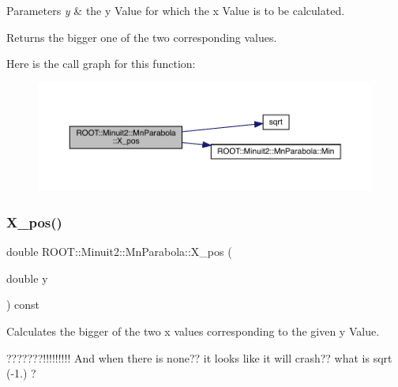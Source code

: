 \begin{DoxyParams}{Parameters}
{\em y} & the y Value for which the x Value is to be calculated.\\
\hline
\end{DoxyParams}
\begin{DoxyReturn}{Returns}
the bigger one of the two corresponding values. 
\end{DoxyReturn}
Here is the call graph for this function\+:
\nopagebreak
\begin{figure}[H]
\begin{center}
\leavevmode
\includegraphics[width=350pt]{db/d7d/classROOT_1_1Minuit2_1_1MnParabola_a2b4623df00488ca3d4175eb92123066e_cgraph}
\end{center}
\end{figure}
\mbox{\label{classROOT_1_1Minuit2_1_1MnParabola_a2b4623df00488ca3d4175eb92123066e}} 
\subsubsection{\texorpdfstring{X\_pos()}{X\_pos()}\hspace{0.1cm}{\footnotesize\ttfamily [2/2]}}
{\footnotesize\ttfamily double R\+O\+O\+T\+::\+Minuit2\+::\+Mn\+Parabola\+::\+X\+\_\+pos (\begin{DoxyParamCaption}\item[{double}]{y }\end{DoxyParamCaption}) const\hspace{0.3cm}{\ttfamily [inline]}}

Calculates the bigger of the two x values corresponding to the given y Value.

???????!!!!!!!!! And when there is none?? it looks like it will crash?? what is sqrt (-\/1.) ?


